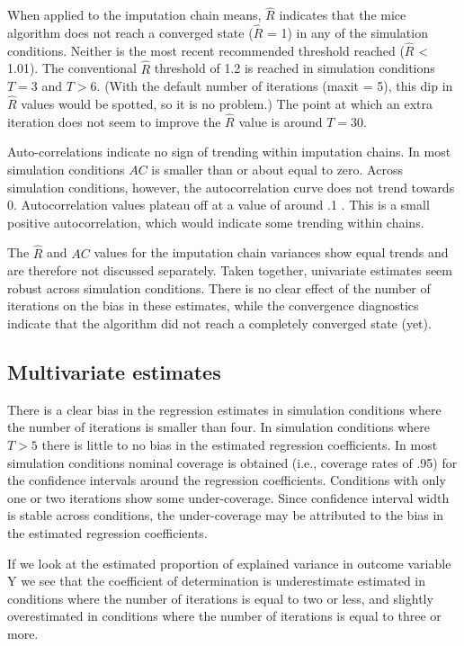 \documentclass[Royal,times,sageh]{sagej}
\begin{document}
When applied to the imputation chain means, \(\widehat{R}\) indicates
that the mice algorithm does not reach a converged state
(\(\widehat{R}\) = 1) in any of the simulation conditions. Neither is
the most recent recommended threshold reached (\(\widehat{R}\)
\textless{} 1.01). The conventional \(\widehat{R}\) threshold of 1.2 is
reached in simulation conditions \(T = 3\) and \(T > 6\). (With the
default number of iterations (maxit = 5), this dip in \(\widehat{R}\)
values would be spotted, so it is no problem.) The point at which an
extra iteration does not seem to improve the \(\widehat{R}\) value is
around \(T=30\).

Auto-correlations indicate no sign of trending within imputation chains.
In most simulation conditions \(AC\) is smaller than or about equal to
zero. Across simulation conditions, however, the autocorrelation curve
does not trend towards 0. Autocorrelation values plateau off at a value
of around .1 . This is a small positive autocorrelation, which would
indicate some trending within chains.

The \(\widehat{R}\) and \(AC\) values for the imputation chain variances
show equal trends and are therefore not discussed separately. Taken
together, univariate estimates seem robust across simulation conditions.
There is no clear effect of the number of iterations on the bias in
these estimates, while the convergence diagnostics indicate that the
algorithm did not reach a completely converged state (yet).

\hypertarget{multivariate-estimates}{%
\subsection{Multivariate estimates}\label{multivariate-estimates}}

There is a clear bias in the regression estimates in simulation
conditions where the number of iterations is smaller than four. In
simulation conditions where \(T > 5\) there is little to no bias in the
estimated regression coefficients. In most simulation conditions nominal
coverage is obtained (i.e., coverage rates of .95) for the confidence
intervals around the regression coefficients. Conditions with only one
or two iterations show some under-coverage. Since confidence interval
width is stable across conditions, the under-coverage may be attributed
to the bias in the estimated regression coefficients.

If we look at the estimated proportion of explained variance in outcome
variable Y we see that the coefficient of determination is underestimate
estimated in conditions where the number of iterations is equal to two
or less, and slightly overestimated in conditions where the number of
iterations is equal to three or more.
\end{document}
